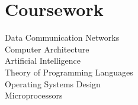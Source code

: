 \documentclass[]{resume}
\begin{document}
\begin{minipage}[t]{0.30\textwidth}
\sectionsep

\section{Coursework}
Data Communication Networks \\
Computer Architecture \\
Artificial Intelligence \\
Theory of Programming Languages \\
Operating Systems Design \\
Microprocessors \\

\sectionsep


%
%

\end{minipage}
\hfill
\end{document}

